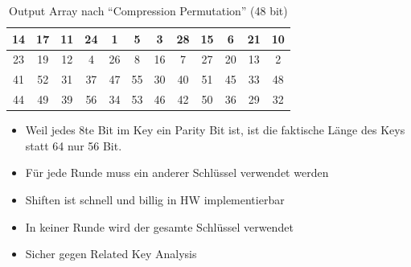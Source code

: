\begin{table}[h]
    \centering
    \begin{tabular}{|*{12}{c|}}
        \hline
        \cellcolor{orange-1}14 & \cellcolor{yellow-1}17 & \cellcolor{orange-1}11 & \cellcolor{yellow-1}24 & 
        \cellcolor{red-1}1 & \cellcolor{red-1}5 & \cellcolor{red-1}3 & \cellcolor{green-1}28 &
        \cellcolor{orange-1}15 & \cellcolor{red-1}6 & \cellcolor{yellow-1}21 & \cellcolor{orange-1}10 \\
        \hline 
        
        \cellcolor{yellow-1}23 & \cellcolor{yellow-1}19 & \cellcolor{orange-1}12 & \cellcolor{red-1}4 & 
        \cellcolor{green-1}26 & \cellcolor{red-1}8 & \cellcolor{orange-1}16 & \cellcolor{red-1}7 & 
        \cellcolor{green-1}27 & \cellcolor{yellow-1}20 & \cellcolor{orange-1}13 & \cellcolor{red-1}2 \\
        \hline

        
        \cellcolor{blue-1}41 & \cellcolor{purple-1}52 & \cellcolor{green-1}31 & \cellcolor{cyan-1}37 & 
        \cellcolor{blue-1}47 & \cellcolor{purple-1}55 & \cellcolor{green-1}30 & \cellcolor{cyan-1}40 & 
        \cellcolor{purple-1}51 & \cellcolor{blue-1}45 & \cellcolor{cyan-1}33 & \cellcolor{blue-1}48 \\
        \hline

        \cellcolor{blue-1}44 & \cellcolor{purple-1}49 & \cellcolor{cyan-1}39 & \cellcolor{purple-1}56 &
        \cellcolor{cyan-1}34 & \cellcolor{purple-1}53 & \cellcolor{blue-1}46 & \cellcolor{blue-1}42 &
        \cellcolor{purple-1}50 & \cellcolor{cyan-1}36 & \cellcolor{green-1}29 & \cellcolor{green-1}32 \\
        \hline
    \end{tabular}
    \caption{Output Array nach ``Compression Permutation'' (48 bit)}
\end{table}

\begin{itemize}
    \item Weil jedes 8te Bit im Key ein Parity Bit ist, ist die faktische Länge des Keys statt 64 nur 56 Bit. 
    \item Für jede Runde muss ein anderer Schlüssel verwendet werden 
    \item Shiften ist schnell und billig in HW implementierbar 
    \item In keiner Runde wird der gesamte Schlüssel verwendet 
    \item Sicher gegen Related Key Analysis
\end{itemize}

